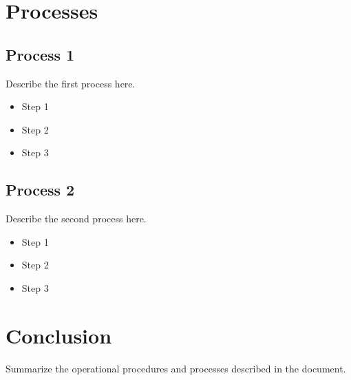 \documentclass{article}
\begin{document}
\section{Processes}

\subsection{Process 1}
Describe the first process here.

\begin{itemize}
    \item Step 1
    \item Step 2
    \item Step 3
\end{itemize}

\subsection{Process 2}
Describe the second process here.

\begin{itemize}
    \item Step 1
    \item Step 2
    \item Step 3
\end{itemize}

\section{Conclusion}
Summarize the operational procedures and processes described in the document.
\end{document}
